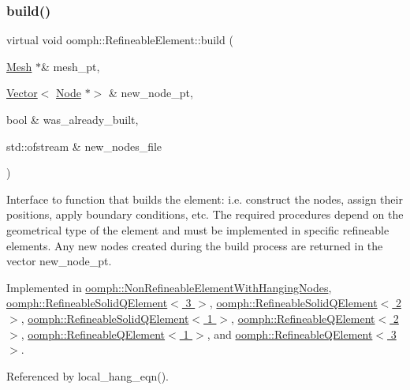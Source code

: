 \subsubsection{\texorpdfstring{build()}{build()}}
{\footnotesize\ttfamily virtual void oomph\+::\+Refineable\+Element\+::build (\begin{DoxyParamCaption}\item[{\hyperlink{classoomph_1_1Mesh}{Mesh} $\ast$\&}]{mesh\+\_\+pt,  }\item[{\hyperlink{classoomph_1_1Vector}{Vector}$<$ \hyperlink{classoomph_1_1Node}{Node} $\ast$$>$ \&}]{new\+\_\+node\+\_\+pt,  }\item[{bool \&}]{was\+\_\+already\+\_\+built,  }\item[{std\+::ofstream \&}]{new\+\_\+nodes\+\_\+file }\end{DoxyParamCaption})\hspace{0.3cm}{\ttfamily [pure virtual]}}



Interface to function that builds the element\+: i.\+e. construct the nodes, assign their positions, apply boundary conditions, etc. The required procedures depend on the geometrical type of the element and must be implemented in specific refineable elements. Any new nodes created during the build process are returned in the vector new\+\_\+node\+\_\+pt. 



Implemented in \hyperlink{classoomph_1_1NonRefineableElementWithHangingNodes_af1eacf195e0bde91008b4bf4a4854a66}{oomph\+::\+Non\+Refineable\+Element\+With\+Hanging\+Nodes}, \hyperlink{classoomph_1_1RefineableSolidQElement_3_013_01_4_a62db84d609d99537e4180bf897a81a9b}{oomph\+::\+Refineable\+Solid\+Q\+Element$<$ 3 $>$}, \hyperlink{classoomph_1_1RefineableSolidQElement_3_012_01_4_abebfabc831b862c49dc181ada6a7ca05}{oomph\+::\+Refineable\+Solid\+Q\+Element$<$ 2 $>$}, \hyperlink{classoomph_1_1RefineableSolidQElement_3_011_01_4_a6b534dd58082904153161cba4034b62f}{oomph\+::\+Refineable\+Solid\+Q\+Element$<$ 1 $>$}, \hyperlink{classoomph_1_1RefineableQElement_3_012_01_4_a8be1a217931d1054ab626ebd1adae182}{oomph\+::\+Refineable\+Q\+Element$<$ 2 $>$}, \hyperlink{classoomph_1_1RefineableQElement_3_011_01_4_aa2104bae648ac4b34caecbbb5fb254dc}{oomph\+::\+Refineable\+Q\+Element$<$ 1 $>$}, and \hyperlink{classoomph_1_1RefineableQElement_3_013_01_4_a8e7f6c2a6aa695c1b6fcd4dbeba3fac6}{oomph\+::\+Refineable\+Q\+Element$<$ 3 $>$}.



Referenced by local\+\_\+hang\+\_\+eqn().

